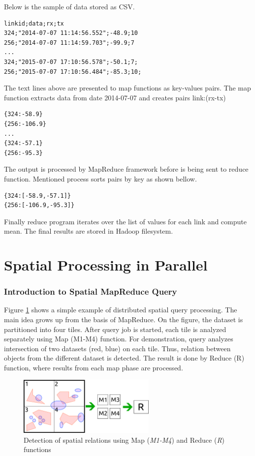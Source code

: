 \documentclass[a4paper,12pt,oneside]{report}
\begin{document}
	Below is the sample of data stored as CSV.
	\begin{footnotesize}
		\begin{lstlisting}[style=mybash]
linkid;data;rx;tx
324;"2014-07-07 11:14:56.552";-48.9;10
256;"2014-07-07 11:14:59.703";-99.9;7
...
324;"2015-07-07 17:10:56.578";-50.1;7;
256;"2015-07-07 17:10:56.484";-85.3;10;
		\end{lstlisting}
	\end{footnotesize}
	The text lines above are presented to map functions as key-values pairs.
	The map function extracts data from date 2014-07-07 and creates pairs
	{link:(rx-tx)}
	\begin{footnotesize}
		\begin{lstlisting}[style=mybash]
{324:-58.9}
{256:-106.9}
...
{324:-57.1}
{256:-95.3}
		\end{lstlisting}
	\end{footnotesize}
	The output is processed by MapReduce framework before is being sent to reduce
	function.
	Mentioned process sorts pairs by key as shown bellow.
	\begin{footnotesize}
		\begin{lstlisting}[style=mybash]
{324:[-58.9,-57.1]}
{256:[-106.9,-95.3]}
		\end{lstlisting}\end{footnotesize}
	Finally reduce program iterates over the list of values for each link and
	compute mean.
	The final results are stored in Hadoop filesystem.

	
	\section{Spatial Processing in Parallel}
	\subsubsection{Introduction to Spatial MapReduce Query}
	Figure \ref{fig:mapred_spatial} shows a simple example of distributed spatial
	query processing. The main idea 
	grows up from the basis of MapReduce. On the figure, the dataset is partitioned
	into four tiles. After 
	query job is started, each tile is analyzed separately using Map (M1-M4)
	function. For demonstration, 
	query analyzes intersection of two datasets (red, blue) on each tile. Thus,
	relation between 
	objects from the different dataset is detected. The result is done by Reduce (R)
	function, where results from each
	map phase are processed.
	
	\begin{figure}[h!]
		\centering
		\includegraphics[width=0.6\textwidth]{./img/mapred_spatial.pdf}
		\caption[Spatial MapReduce]{\centering Detection of spatial relations using
			Map (\textit{M1-M4}) and Reduce (\textit{R}) functions}
		\label{fig:mapred_spatial}
	\end{figure}
\end{document}
